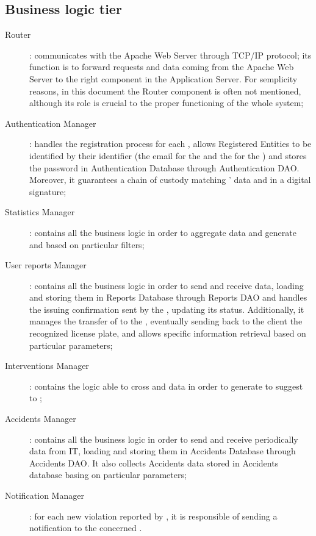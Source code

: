 \documentclass[../../DD.tex]{subfiles}
\begin{document}
\subsection{Business logic tier\label{sect:2.2.3}}
	\begin{description}
	\item[Router]: communicates with the Apache Web Server through TCP/IP protocol; its function is to forward requests and data coming from the Apache Web Server to the right component in the Application Server. For semplicity reasons, in this document the Router component is often not mentioned, although its role is crucial to the proper functioning of the whole system;
	 
	\item[Authentication Manager]: handles the registration process for each ,
	allows Registered Entities to be identified by their identifier (the email for the  and the  for the ) and stores the password in Authentication Database through Authentication DAO. Moreover, it guarantees a chain of custody matching ' data and  in a digital signature;
	
	\item[Statistics Manager]: contains all the business logic in order to aggregate  data and generate  and   based on particular filters;
	
	\item[User reports Manager]: contains all the business logic in order to send and receive  data, loading and storing them in Reports Database through Reports DAO and handles the  issuing confirmation sent by the , updating its status. Additionally, it manages the transfer of  to the , eventually sending back to the client the recognized license plate, and allows specific  information retrieval based on particular parameters;
	
	\item[Interventions Manager]: contains the logic able to cross  and  data in order to generate  to suggest to ;
	
	\item[Accidents Manager]: contains all the business logic in order to send and receive periodically  data from  IT, loading and storing them in Accidents Database through Accidents DAO. It also collects Accidents data stored in Accidents database basing on particular parameters;
	
	\item[Notification Manager]: for each new violation reported by , it is responsible of sending a notification to the concerned .
	\end{description}
\end{document}
